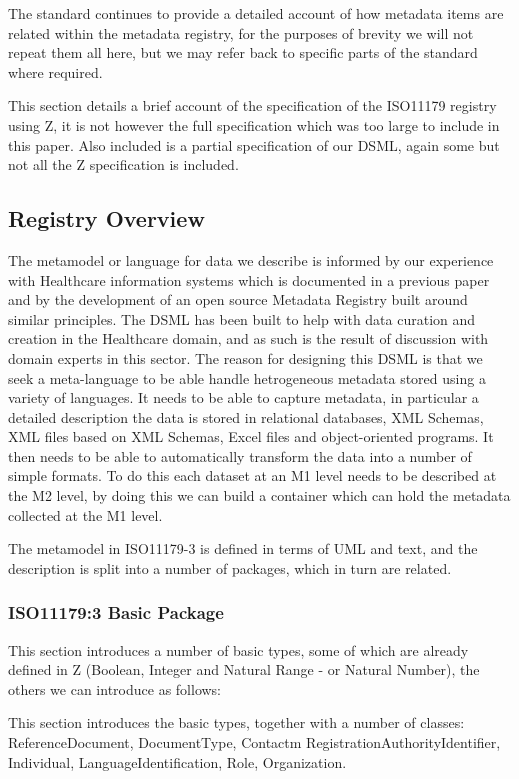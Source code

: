 \documentclass{llncs}
\begin{document}
The standard continues to provide a detailed account of how metadata items are related within the metadata registry, for the purposes of brevity we will not repeat them all here, but we may refer back to specific parts of the standard where required.

This section details a brief account of the specification of the ISO11179 registry using Z, it is not however the full specification which was too large to include in this paper. Also included is a partial specification of our DSML, again some but not all the Z specification is included.




\subsection{Registry Overview}

The metamodel or language for data we describe is informed by our experience with Healthcare information systems which is documented in a previous paper \cite{DSMCR} and by the development of an open source Metadata Registry built around similar principles. The DSML has been built to help with data curation and creation in the Healthcare domain, and as such is the result of discussion with domain experts in this sector. The reason for designing this DSML  is that we seek a meta-language to be able handle hetrogeneous metadata stored using a variety of languages. It needs to be able to capture metadata, in particular a detailed description the data is stored in relational databases, XML Schemas, XML files based on XML Schemas, Excel files and object-oriented programs. It then needs to be able to automatically transform the data into a number of simple formats. To do this each dataset at an M1 level needs to be described at the M2 level, by doing this we can build a container which can hold the metadata collected at the M1 level.

The metamodel in ISO11179-3 is defined in terms of UML and text, and the description is split into a number of packages, which in turn are related.
\begin{zed}

\end{zed}


\subsubsection{ISO11179:3 Basic Package}
This section introduces a number of basic types, some of which are already defined in Z (Boolean, Integer and Natural Range - or Natural Number), the others we can introduce as follows:
\begin{zed}
\end{zed}
This section introduces the basic types, together with a number of classes: ReferenceDocument, DocumentType, Contactm RegistrationAuthorityIdentifier, Individual, LanguageIdentification, Role, Organization.
\end{document}
